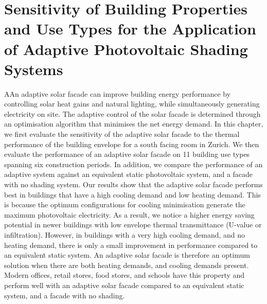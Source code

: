 
\chapter{Sensitivity of Building Properties and Use Types for the Application of Adaptive Photovoltaic Shading Systems}
\label{ch:asfArchetype}

\graphicspath{{chapters/ch3Archetype//Images/}}

\begin{chapterabstract}
AAn adaptive solar facade can improve building energy performance by controlling solar heat gains and natural lighting, while simultaneously generating electricity on site. The adaptive control of the solar facade is determined through an optimisation algorithm that minimises the net energy demand. In this chapter, we first evaluate the sensitivity of the adaptive solar facade to the thermal performance of the building envelope for a south facing room in Zurich. We then evaluate the performance of an adaptive solar facade on 11 building use types spanning six construction periods. In addition, we compare the performance of an adaptive system against an equivalent static photovoltaic system, and a facade with no shading system. Our results show that the adaptive solar facade performs best in buildings that have a high cooling demand and low heating demand. This is because the optimum configurations for cooling minimisation generate the maximum photovoltaic electricity. As a result, we notice a higher energy saving potential in newer buildings with low envelope thermal transmittance (U-value or infiltration). However, in buildings with a very high cooling demand, and no heating demand, there is only a small improvement in performance compared to an equivalent static system. An adaptive solar facade is therefore an optimum solution when there are both heating demands, and cooling demands present. Modern offices, retail stores, food stores, and schools have this property and perform well with an adaptive solar facade compared to an equivalent static system, and a facade with no shading.
\end{chapterabstract}


